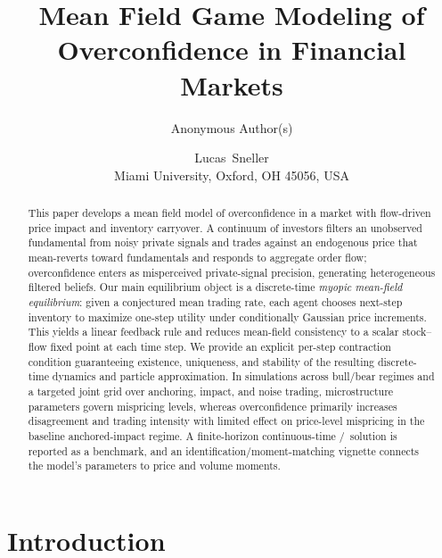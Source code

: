 \documentclass[11pt,a4paper]{article}
\title{Mean Field Game Modeling of Overconfidence in Financial Markets}
\author{Anonymous Author(s)}
\author{Lucas~Sneller\\[0.5em]\normalsize Miami University, Oxford, OH 45056, USA}
\date{}
\theoremstyle{plain}
\theoremstyle{definition}
\theoremstyle{remark}
\newcommand{\CARA}{\text{CARA}}
\newcommand{\LQG}{\text{LQG}}
\begin{document}
\maketitle
\thispagestyle{empty}

\begin{abstract}
This paper develops a mean field model of overconfidence in a market with flow-driven price impact and inventory carryover. A continuum of investors filters an unobserved fundamental from noisy private signals and trades against an endogenous price that mean-reverts toward fundamentals and responds to aggregate order flow; overconfidence enters as misperceived private-signal precision, generating heterogeneous filtered beliefs. Our main equilibrium object is a discrete-time \emph{myopic mean-field equilibrium}: given a conjectured mean trading rate, each agent chooses next-step inventory to maximize one-step \CARA utility under conditionally Gaussian price increments. This yields a linear feedback rule and reduces mean-field consistency to a scalar stock--flow fixed point at each time step. We provide an explicit per-step contraction condition guaranteeing existence, uniqueness, and stability of the resulting discrete-time dynamics and particle approximation. In simulations across bull/bear regimes and a targeted joint grid over anchoring, impact, and noise trading, microstructure parameters govern mispricing levels, whereas overconfidence primarily increases disagreement and trading intensity with limited effect on price-level mispricing in the baseline anchored-impact regime. A finite-horizon continuous-time \CARA/\LQG\ solution is reported as a benchmark, and an identification/moment-matching vignette connects the model's parameters to price and volume moments.
\end{abstract}

\section{Introduction}
\label{sec:introduction}

\end{document}
